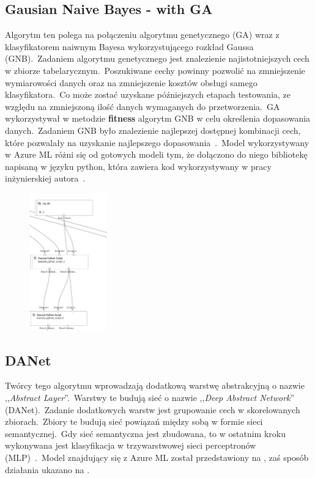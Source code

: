\subsection{Gausian Naive Bayes - with GA}
Algorytm ten polega na połączeniu algorytmu genetycznego (GA) wraz z klasyfikatorem naiwnym Bayesa wykorzystującego rozkład Gaussa (GNB).\ Zadaniem algorytmu genetycznego jest znalezienie najistotniejszych cech w zbiorze tabelarycznym.\ Poszukiwane cechy powinny pozwolić na zmniejszenie wymiarowości danych oraz na zmniejszenie kosztów obsługi samego klasyfikatora.\ Co może zostać uzyskane późniejszych etapach testowania, ze względu na zmniejszoną ilość danych wymaganych do przetworzenia.\ GA wykorzystywał w metodzie \textbf{fitness} algorytm GNB w celu określenia dopasowania danych.\ Zadaniem GNB było znalezienie najlepszej dostępnej kombinacji cech, które pozwalały na uzyskanie najlepszego dopasowania~\cite{Blyszcz2022}.\ Model wykorzystywany w Azure ML różni się od gotowych modeli tym, że dołączono do niego bibliotekę napisaną w języku python, która zawiera kod wykorzystywany w pracy inżynierskiej autora~\cite{Suvres2023}.
\begin{figure}[H]
    \centering
    \includegraphics[width=0.3\textwidth]{images/ga_pipe}
    \label{fig:ga-pipe}
\end{figure}

\vfill
\pagebreak

\subsection{DANet}
Twórcy tego algorytmu wprowadzają dodatkową warstwę abstrakcyjną o nazwie ,,\textit{Abstract Layer}''.\ Warstwy te budują sieć o nazwie ,,\textit{Deep Abstract Network}'' (DANet).\ Zadanie dodatkowych warstw jest grupowanie cech w skorelowanych zbiorach.\ Zbiory te budują sieć powiązań między sobą w formie sieci semantycznej.\ Gdy sieć semantyczna jest zbudowana, to w ostatnim kroku wykonywana jest klasyfikacja w trzywarstwowej sieci perceptronów  (MLP)~\cite{Chen2022, Danet}.\ Model znajdujący się z Azure ML został przedstawiony na , zaś sposób działania ukazano na .

